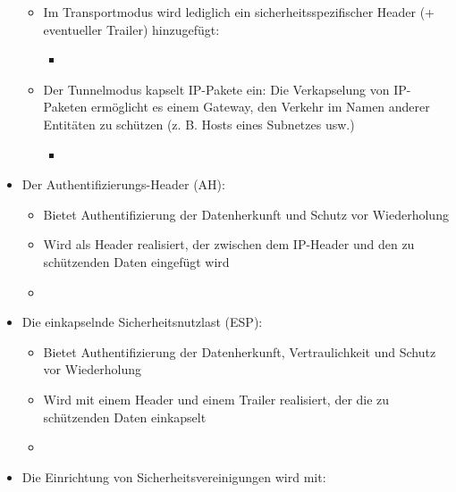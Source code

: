 \documentclass[a4paper]{article}
\begin{document}
\begin{multicols}{3}
\begin{itemize}
              \begin{itemize}
                  \item
                        Im Transportmodus wird lediglich ein sicherheitsspezifischer Header
                        (+ eventueller Trailer) hinzugefügt:

                        \begin{itemize}
                            \item
                        \end{itemize}
                  \item
                        Der Tunnelmodus kapselt IP-Pakete ein: Die Verkapselung von
                        IP-Paketen ermöglicht es einem Gateway, den Verkehr im Namen anderer
                        Entitäten zu schützen (z. B. Hosts eines Subnetzes usw.)

                        \begin{itemize}
                            \item
                        \end{itemize}
              \end{itemize}
        \item
              Der Authentifizierungs-Header (AH):

              \begin{itemize}
                  \item
                        Bietet Authentifizierung der Datenherkunft und Schutz vor
                        Wiederholung
                  \item
                        Wird als Header realisiert, der zwischen dem IP-Header und den zu
                        schützenden Daten eingefügt wird
                  \item
              \end{itemize}
        \item
              Die einkapselnde Sicherheitsnutzlast (ESP):

              \begin{itemize}
                  \item
                        Bietet Authentifizierung der Datenherkunft, Vertraulichkeit und
                        Schutz vor Wiederholung
                  \item
                        Wird mit einem Header und einem Trailer realisiert, der die zu
                        schützenden Daten einkapselt
                  \item
              \end{itemize}
        \item
              Die Einrichtung von Sicherheitsvereinigungen wird mit:


\end{itemize}
\end{multicols}
\end{document}
